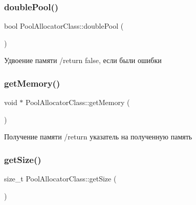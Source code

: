 \mbox{\label{class_pool_allocator_class_ab977725840a7cffd71aed8ed87358635}} 
\subsubsection{\texorpdfstring{double\+Pool()}{doublePool()}}
{\footnotesize\ttfamily bool Pool\+Allocator\+Class\+::double\+Pool (\begin{DoxyParamCaption}{ }\end{DoxyParamCaption})}



Удвоение памяти /return false, если были ошибки 

\mbox{\label{class_pool_allocator_class_a048c4423ea1c882805d2215560d72b6d}} 
\subsubsection{\texorpdfstring{get\+Memory()}{getMemory()}}
{\footnotesize\ttfamily void $\ast$ Pool\+Allocator\+Class\+::get\+Memory (\begin{DoxyParamCaption}{ }\end{DoxyParamCaption})}



Получение памяти /return указатель на полученную память 

\mbox{\label{class_pool_allocator_class_ae04f13effd4cab7567169f28082327c7}} 
\subsubsection{\texorpdfstring{get\+Size()}{getSize()}}
{\footnotesize\ttfamily size\+\_\+t Pool\+Allocator\+Class\+::get\+Size (\begin{DoxyParamCaption}{ }\end{DoxyParamCaption})}




